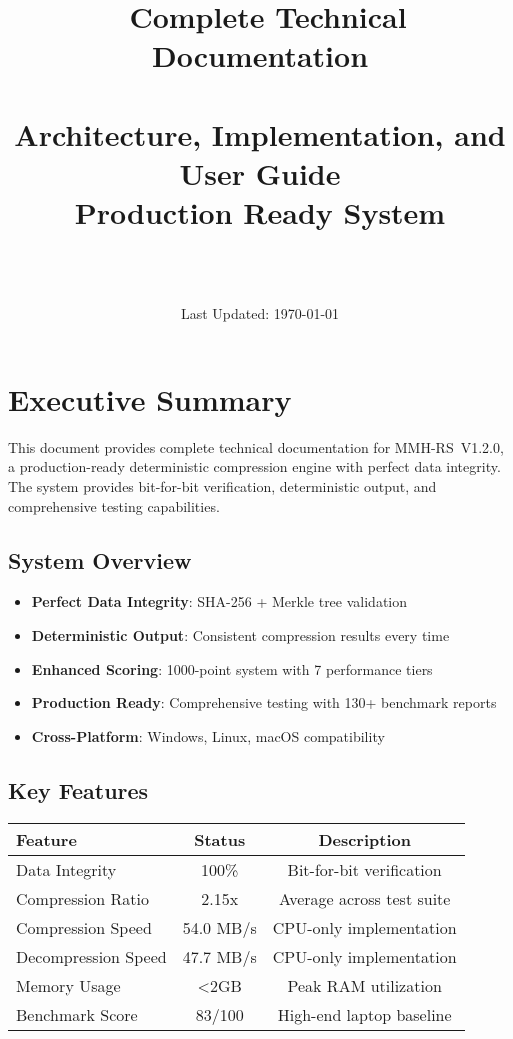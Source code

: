 \documentclass[12pt,a4paper]{article}
\title{\Huge\textbf{\project\ Complete Technical Documentation}\\[0.5cm]
\Large\textbf{\version}\\[0.3cm]
\large Architecture, Implementation, and User Guide\\[0.5cm]
\large Production Ready System}
\author{\Large\authorname\\[0.2cm]\email\\[0.2cm]\github}
\date{\large Last Updated: \today}
\newcommand{\version}{V1.2.0}
\newcommand{\project}{MMH-RS}
\begin{document}
\maketitle
\thispagestyle{empty}

\tableofcontents
\newpage

\section{Executive Summary}

This document provides complete technical documentation for \project\ \version, a production-ready deterministic compression engine with perfect data integrity. The system provides bit-for-bit verification, deterministic output, and comprehensive testing capabilities.

\subsection{System Overview}
\begin{itemize}
    \item \textbf{Perfect Data Integrity}: SHA-256 + Merkle tree validation
    \item \textbf{Deterministic Output}: Consistent compression results every time
    \item \textbf{Enhanced Scoring}: 1000-point system with 7 performance tiers
    \item \textbf{Production Ready}: Comprehensive testing with 130+ benchmark reports
    \item \textbf{Cross-Platform}: Windows, Linux, macOS compatibility
\end{itemize}

\subsection{Key Features}
\begin{center}
\begin{tabular}{|l|c|c|}
\hline
\textbf{Feature} & \textbf{Status} & \textbf{Description} \\
\hline
Data Integrity & 100\% & Bit-for-bit verification \\
Compression Ratio & 2.15x & Average across test suite \\
Compression Speed & 54.0 MB/s & CPU-only implementation \\
Decompression Speed & 47.7 MB/s & CPU-only implementation \\
Memory Usage & <2GB & Peak RAM utilization \\
Benchmark Score & 83/100 & High-end laptop baseline \\
\hline
\end{tabular}
\end{center}
\end{document}
